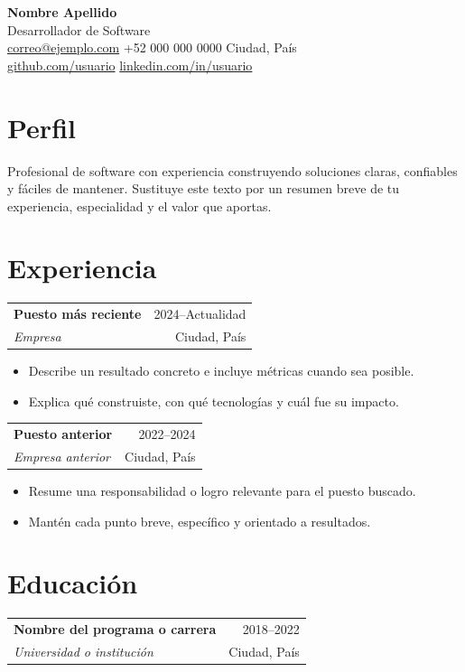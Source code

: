 \documentclass[11pt,a4paper]{article}
\makeatletter
\newcommand{\entry}[4]{%
  \begin{tabularx}{\linewidth}{@{}Xr@{}}
    \textbf{#1} & \textcolor{muted}{#2} \\
    \textit{#3} & \textcolor{muted}{#4}
  \end{tabularx}\vspace{0.25em}
}
\makeatother
\begin{document}
\begin{center}
  {\Huge\bfseries Nombre Apellido}\\[0.35em]
  {\large\color{accent}Desarrollador de Software}\\[0.6em]
  \href{mailto:correo@ejemplo.com}{correo@ejemplo.com}
  \quad\textcolor{accent}{\textbullet}\quad
  +52 000 000 0000
  \quad\textcolor{accent}{\textbullet}\quad
  Ciudad, País\\[0.25em]
  \href{https://github.com/usuario}{github.com/usuario}
  \quad\textcolor{accent}{\textbullet}\quad
  \href{https://linkedin.com/in/usuario}{linkedin.com/in/usuario}
\end{center}

\section{Perfil}

Profesional de software con experiencia construyendo soluciones claras,
confiables y fáciles de mantener. Sustituye este texto por un resumen breve
de tu experiencia, especialidad y el valor que aportas.

\section{Experiencia}

\entry{Puesto más reciente}{2024--Actualidad}{Empresa}{Ciudad, País}
\begin{itemize}
  \item Describe un resultado concreto e incluye métricas cuando sea posible.
  \item Explica qué construiste, con qué tecnologías y cuál fue su impacto.
\end{itemize}

\entry{Puesto anterior}{2022--2024}{Empresa anterior}{Ciudad, País}
\begin{itemize}
  \item Resume una responsabilidad o logro relevante para el puesto buscado.
  \item Mantén cada punto breve, específico y orientado a resultados.
\end{itemize}

\section{Educación}

\entry{Nombre del programa o carrera}{2018--2022}{Universidad o institución}{Ciudad, País}
\end{document}
